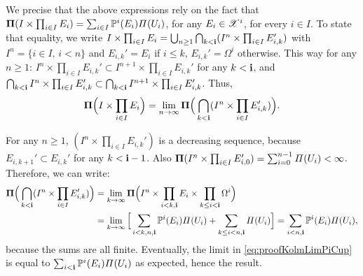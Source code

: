 We precise that the above expressions rely on the fact that $\mathbf{\Pi}(I\times\prod_{i\in I}E_i)=\sum_{i\in I}\mathbb{P}^i(E_i)\varPi(U_i)$, for any $E_i\in\mathscr{X}^i$, for every ${i\in I}$. To state that equality, we write $I\times\prod_{i\in I}E_i=\bigcup_{n\geq1}\bigcap_{k<\mathbf{i}}(I^n\times\prod_{i\in I}E_{i,k}') $ with $I^n=\{i\in I,\,i< n\}$ and $E_{i,k}'=E_i$ if $i\leq k$, $E_{i,k}'=\Omega^i$ otherwise. This way for any $n\geq1$:
$I^n\times\prod_{i\in I} E_{i,k}' \subset I^{n+1}\times\prod_{i\in I} E_{i,k}'$ for any $k<\mathbf{i}$, and
$        \bigcap_{k<\mathbf{i}} I^n\times\prod_{i\in I} E_{i,k}'\subset \bigcap_{k<\mathbf{i}} I^{n+1}\times\prod_{i\in I} E_{i,k}'$.
Thus,
    \begin{equation}\label{eq:proofKolmLimPiCup}
        \mathbf{\Pi}\Big(I\times\prod_{i\in I}E_i\Big) 
            = \lim_{n\rightarrow\infty}\mathbf{\Pi}\Big(\bigcap_{k<\mathbf{i}}(I^n\times\prod_{i\in I}E_{i,k}')\Big).
    \end{equation}


For any $n\geq1$, $ %
(I^n\times\prod_{i\in I}E_{i,k}')$ is a decreasing sequence, because $E_{i,k+1}'\subset E_{i,k}'$ for any $k<\mathbf{i}-1$. 
Also $\mathbf{\Pi}(I^n\times\prod_{i\in I}E_{i,0}')=\sum_{i=0}^{n-1}\varPi(U_i)<\infty$.
Therefore, we can write:
    \begin{align}
        \mathbf{\Pi}\Big(\bigcap_{k<\mathbf{i}}(I^n\times\prod_{i\in I}E_{i,k}')\Big) 
            &= \lim_{k\rightarrow\infty} \mathbf{\Pi}\Big(I^n\times\prod_{i<k,\mathbf{i}}E_i\times\prod_{k\leq i<\mathbf{i}}\Omega^i\Big) \\
            &= \lim_{k\rightarrow\infty} \Big[\sum_{i<k,n,\mathbf{i}}\mathbb{P}^i(E_i)\varPi(U_i)  + \sum_{k\leq i<n,\mathbf{i}}\varPi(U_i)\Big]=\sum_{i<n,\mathbf{i}}\mathbb{P}^i(E_i)\varPi(U_i),\nonumber
    \end{align}
because the sums are all finite. Eventually, the limit in \cref{eq:proofKolmLimPiCup} is equal to $\sum_{i<\mathbf{i}}\mathbb{P}^i(E_i)\varPi(U_i)$ as expected, hence the result.






